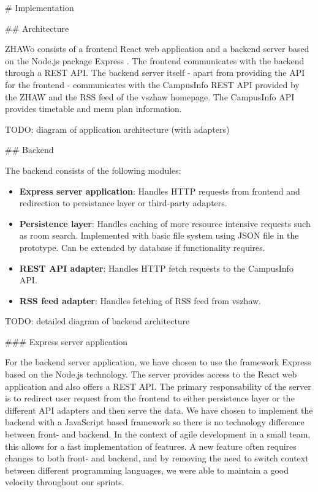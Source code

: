 \begin{markdown}

# Implementation

## Architecture

ZHAWo consists of a frontend React \cite{React} web application and a backend server based on the Node.js \cite{Node} package Express \cite{Express}. The frontend communicates with the backend through a REST API. The backend server itself - apart from providing the API for the frontend - communicates with the CampusInfo REST API provided by the ZHAW and the RSS feed of the vszhaw homepage. The CampusInfo API provides timetable and menu plan information.

\bigskip

TODO: diagram of application architecture (with adapters)

\bigskip

## Backend

The backend consists of the following modules:

\begin{itemize}
  \item \textbf{Express server application}: Handles HTTP requests from frontend and redirection to persistance layer or third-party adapters.
  \item \textbf{Persistence layer}: Handles caching of more resource intensive requests such as room search. Implemented with basic file system using JSON file in the prototype. Can be extended by database if functionality requires.
  \item \textbf{REST API adapter}: Handles HTTP fetch requests to the CampusInfo API.
  \item \textbf{RSS feed adapter}: Handles fetching of RSS feed from vszhaw.
\end{itemize}

TODO: detailed diagram of backend architecture

### Express server application

For the backend server application, we have chosen to use the framework Express \cite{Express} based on the Node.js \cite{Node} technology. The server provides access to the React web application and also offers a REST API. The primary responsability of the server is to redirect user request from the frontend to either persistence layer or the different API adapters and then serve the data. We have chosen to implement the backend with a JavaScript based framework so there is no technology difference between front- and backend. In the context of agile development in a small team, this allows for a fast implementation of features. A new feature often requires changes to both front- and backend, and by removing the need to switch context between different programming languages, we were able to maintain a good velocity throughout our sprints.


\end{markdown}
